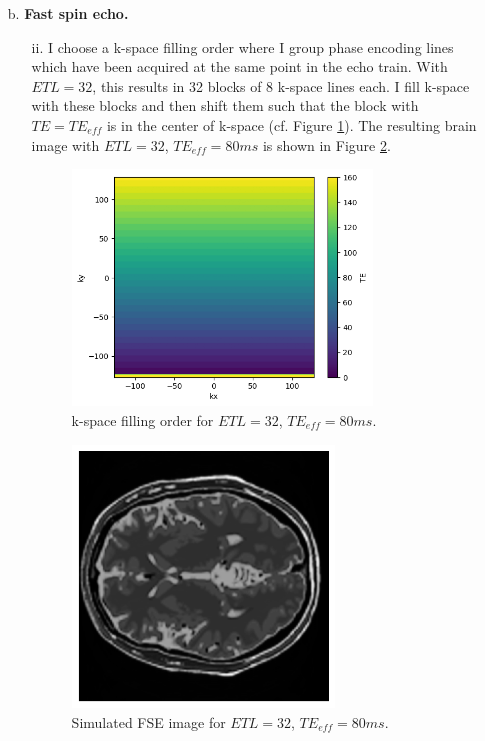 \documentclass{article}
\begin{document}
\begin{itemize}
    \item[b. ] \textbf{Fast spin echo.}
    
    \begin{itemize}
        \item[ii.] I choose a k-space filling order where I group phase encoding lines which have been acquired at the same point in the echo train. With $ETL=32$, this results in 32 blocks of 8 k-space lines each. I fill k-space with these blocks and then shift them such that the block with $TE=TE_{eff}$ is in the center of k-space (cf. Figure \ref{fig:2_b_ii_kspace}). The resulting brain image with $ETL=32$, $TE_{eff}=80ms$ is shown in Figure \ref{fig:2_b_ii_image}.
        
        \begin{figure}[]
            \centering
            \includegraphics[width=0.8\textwidth]{figures/2_b_ii_kspace.png}
            \caption{k-space filling order for $ETL=32$, $TE_{eff}=80ms$.}
            \label{fig:2_b_ii_kspace}
        \end{figure}

        \begin{figure}[]
            \centering
            \includegraphics[width=0.7\textwidth]{figures/2_b_ii_image.png}
            \caption{Simulated FSE image for $ETL=32$, $TE_{eff}=80ms$.}
            \label{fig:2_b_ii_image}
        \end{figure}


\end{itemize}
\end{itemize}
\end{document}
